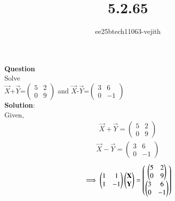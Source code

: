 \documentclass[journal]{IEEEtran}
\begin{document}

\vspace{3cm}

\title{5.2.65}
\author{ee25btech11063-vejith}

\maketitle
{\let\newpage\relax\maketitle}
\renewcommand{\thefigure}{\theenumi}
\renewcommand{\thetable}{\theenumi}
\setlength{\intextsep}{10pt} %
\textbf{Question}\\
Solve\\
$\Vec{X}$+$\Vec{Y}$=$\begin{pmatrix}
    5 & 2\\
    0 & 9
\end{pmatrix}$ and $\Vec{X}$-$\Vec{Y}$=$\begin{pmatrix}
    3 & 6\\
    0 & -1
\end{pmatrix}$\\
\textbf{Solution}:\\
Given,
\begin{align}
    \Vec{X}+\Vec{Y}=\begin{pmatrix}
    5 & 2\\
    0 & 9
    \end{pmatrix}
\end{align}
\begin{align}
    \Vec{X}-\Vec{Y}=\begin{pmatrix}
    3 & 6\\
    0 & -1
\end{pmatrix}
\end{align}
\begin{align}
    \implies \begin{pmatrix}
        1 & 1\\
         1 & -1
    \end{pmatrix} \begin{pmatrix}\mathbf{X}\\\mathbf{Y}\end{pmatrix}=\begin{pmatrix}\begin{pmatrix} 5 & 2 \\ 0 & 9 \end{pmatrix}\\\begin{pmatrix} 3 & 6 \\ 0 & -1 \end{pmatrix}\end{pmatrix}
    \end{align}
\end{document}
